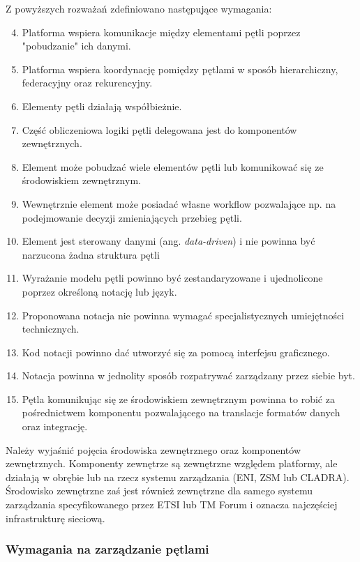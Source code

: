 Z powyższych rozważań zdefiniowano następujące wymagania:
\begin{enumerate}
    \setcounter{enumi}{3} 
    \item \label{req:4} Platforma wspiera komunikacje między elementami pętli poprzez "pobudzanie" ich danymi.
    \item \label{req:5} Platforma wspiera koordynację pomiędzy pętlami w sposób hierarchiczny, federacyjny oraz rekurencyjny.
    \item \label{req:6} Elementy pętli działają współbieżnie.
    \item \label{req:7} Część obliczeniowa logiki pętli delegowana jest do komponentów zewnętrznych.
    \item \label{req:8} Element może pobudzać wiele elementów pętli lub komunikować się ze środowiskiem zewnętrznym.
    \item \label{req:9} Wewnętrznie element może posiadać własne workflow pozwalające np. na podejmowanie decyzji zmieniających przebieg pętli.
    \item \label{req:10} Element jest sterowany danymi (ang. \textit{data-driven}) i nie powinna być narzucona żadna struktura pętli
    \item \label{req:11} Wyrażanie modelu pętli powinno być zestandaryzowane i ujednolicone poprzez określoną notację lub język.
    \item \label{req:12} Proponowana notacja nie powinna wymagać specjalistycznych umiejętności technicznych.
    \item \label{req:13} Kod notacji powinno dać utworzyć się za pomocą interfejsu graficznego.
    \item \label{req:14} Notacja powinna w jednolity sposób rozpatrywać zarządzany przez siebie byt.
    \item \label{req:15} Pętla komunikując się ze środowiskiem zewnętrznym powinna to robić za pośrednictwem komponentu pozwalającego na translacje formatów danych oraz integrację.
\end{enumerate}

Należy wyjaśnić pojęcia środowiska zewnętrznego oraz komponentów zewnętrznych. Komponenty zewnętrze są zewnętrzne względem platformy, ale działają w obrębie lub na rzecz systemu zarządzania (ENI, ZSM lub CLADRA). Środowisko zewnętrzne zaś jest również zewnętrzne dla samego systemu zarządzania specyfikowanego przez ETSI lub TM Forum i oznacza najczęściej infrastrukturę sieciową. 

\subsubsection{Wymagania na zarządzanie pętlami}

